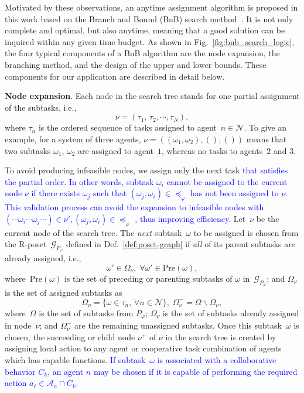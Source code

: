 Motivated by these observations, an anytime assignment
algorithm is proposed in this work based on the Branch and Bound (BnB) search
method~\citep{morrison2016branch}.
It is not only complete and optimal, but also anytime, meaning that a good
solution can be inquired within any given time budget.
As shown in Fig.~\ref{fig:bnb_search_logic},
the four typical components of a BnB
algorithm are the node expansion, the branching method,
and the design of the upper and lower bounds.
These components for our application are described in detail below.


\textbf{Node expansion}.
Each node in the search tree stands for one partial assignment of the
subtasks, i.e.,
\begin{equation}\label{eq:node}
\nu = (\tau_1,\,\tau_2,\cdots,\tau_N),
\end{equation}
where $\tau_n$ is the ordered sequence of tasks assigned to agent~$n\in \mathcal{N}$.
To give an example, for a system of three agents,
$\nu=((\omega_1,\omega_2),(),())$ means that two subtasks
$\omega_1,\, \omega_2$ are assigned to agent~$1$,
whereas no tasks to agents~$2$ and $3$.


To avoid producing infeasible nodes, we assign only the next task
\textcolor{blue}{that satisfies the partial order.}
\textcolor{blue}{In other words, subtask $\omega_i$ cannot 
be assigned to the current node $\nu$ if there exists $\omega_j$
such that $(\omega_j,\omega_i)\in\preceq_\varphi$ has not been assigned to $\nu$.
This validation process can avoid the expansion to infeasible nodes with $(\cdots\omega_i\cdots\omega_j\cdots)\in\nu', (\omega_j,\omega_i)\in\preceq_\varphi$
, thus improving  efficiency.} 
 Let~$\nu$ be the current node of the search tree.
The \emph{next} subtask~$\omega$ to be assigned is chosen from the
R-poset~$\mathcal{G}_{P_\varphi}$ defined in Def.~\ref{def:poset-graph}
if \emph{all} of its parent subtasks are already assigned, i.e.,
\begin{equation}\label{eq:next-task}
\omega' \in \Omega_\nu, \; \forall \omega' \in \text{Pre}(\omega),
\end{equation}
where~$\text{Pre}(\omega)$ is the set of preceding or parenting subtasks of $\omega$ in~$\mathcal{G}_{P_\varphi}$;
and $\Omega_\nu$ is the set of assigned subtasks as
\begin{equation}\label{eq:node-tasks}
\Omega_{\nu}=\{\omega\in\tau_n,\,\forall n\in \mathcal{N}\},
\;\Omega^-_{\nu} = \Omega\backslash \Omega_{\nu},
\end{equation}
where~$\Omega$ is the set of subtasks from $P_\varphi$;
$\Omega_{\nu}$ is the set of subtasks already assigned in node~$\nu$;
and $\Omega^-_{\nu}$ are the remaining unassigned subtasks. Once this
subtask~$\omega$ is chosen, the succeeding or child node $\nu^+$
of $\nu$ in the search tree is created by assigning local action to any agent or
cooperative task combination of agents which has capable functions. 
\textcolor{blue}{If subtask~$\omega$ is associated with a collaborative
  behavior $C_k$, an agent $n$ may be chosen if it is capable of performing
the required action $a_\ell\in\mathcal{A}_n\cap C_k$.}

